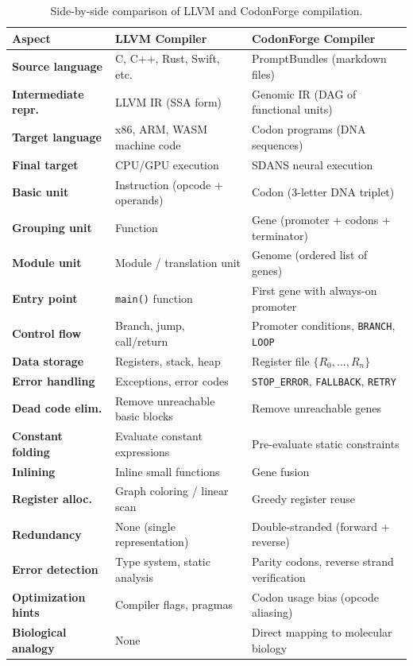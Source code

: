 \begin{table}[htbp]
\centering
\caption{Side-by-side comparison of LLVM and CodonForge compilation.}
\label{tab:llvm-comparison}
\renewcommand{\arraystretch}{1.2}
\small
\begin{tabularx}{0.97\textwidth}{L{3cm} Y Y}
\toprule
\textbf{Aspect} & \textbf{LLVM Compiler} & \textbf{CodonForge Compiler} \\
\midrule
\textbf{Source language} & C, C++, Rust, Swift, etc. & PromptBundles (markdown files) \\
\textbf{Intermediate repr.} & LLVM IR (SSA form) & Genomic IR (DAG of functional units) \\
\textbf{Target language} & x86, ARM, WASM machine code & Codon programs (DNA sequences) \\
\textbf{Final target} & CPU/GPU execution & SDANS neural execution \\
\midrule
\textbf{Basic unit} & Instruction (opcode + operands) & Codon (3-letter DNA triplet) \\
\textbf{Grouping unit} & Function & Gene (promoter + codons + terminator) \\
\textbf{Module unit} & Module / translation unit & Genome (ordered list of genes) \\
\textbf{Entry point} & \texttt{main()} function & First gene with always-on promoter \\
\midrule
\textbf{Control flow} & Branch, jump, call/return & Promoter conditions, \texttt{BRANCH}, \texttt{LOOP} \\
\textbf{Data storage} & Registers, stack, heap & Register file $\{R_0, \ldots, R_n\}$ \\
\textbf{Error handling} & Exceptions, error codes & \texttt{STOP\_ERROR}, \texttt{FALLBACK}, \texttt{RETRY} \\
\midrule
\textbf{Dead code elim.} & Remove unreachable basic blocks & Remove unreachable genes \\
\textbf{Constant folding} & Evaluate constant expressions & Pre-evaluate static constraints \\
\textbf{Inlining} & Inline small functions & Gene fusion \\
\textbf{Register alloc.} & Graph coloring / linear scan & Greedy register reuse \\
\midrule
\textbf{Redundancy} & None (single representation) & Double-stranded (forward + reverse) \\
\textbf{Error detection} & Type system, static analysis & Parity codons, reverse strand verification \\
\textbf{Optimization hints} & Compiler flags, pragmas & Codon usage bias (opcode aliasing) \\
\textbf{Biological analogy} & None & Direct mapping to molecular biology \\
\bottomrule
\end{tabularx}
\end{table}

